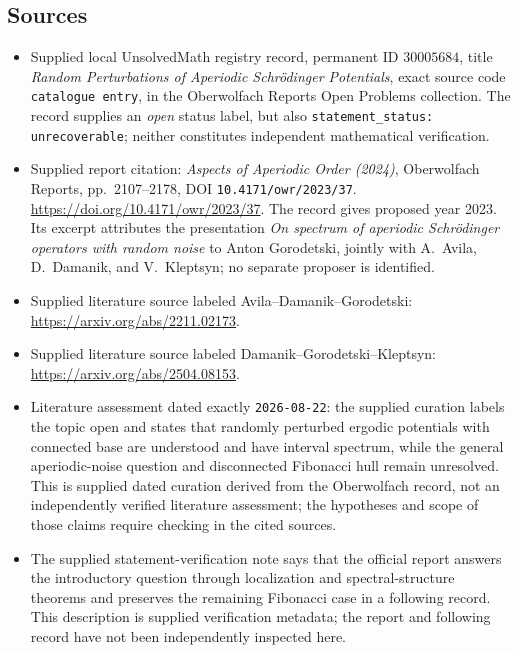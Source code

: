 \documentclass[11pt]{article}
\begin{document}
\subsection{Sources}
\begin{itemize}
\item Supplied local UnsolvedMath registry record, permanent ID \(30005684\), title \emph{Random Perturbations of Aperiodic Schr\"odinger Potentials}, exact source code \texttt{catalogue entry}, in the Oberwolfach Reports Open Problems collection. The record supplies an \emph{open} status label, but also \texttt{statement\_status: unrecoverable}; neither constitutes independent mathematical verification.
\item Supplied report citation: \emph{Aspects of Aperiodic Order (2024)}, Oberwolfach Reports, pp.\ 2107--2178, DOI \texttt{10.4171/owr/2023/37}. \url{https://doi.org/10.4171/owr/2023/37}. The record gives proposed year 2023. Its excerpt attributes the presentation \emph{On spectrum of aperiodic Schr\"odinger operators with random noise} to Anton Gorodetski, jointly with A.\ Avila, D.\ Damanik, and V.\ Kleptsyn; no separate proposer is identified.
\item Supplied literature source labeled Avila--Damanik--Gorodetski: \url{https://arxiv.org/abs/2211.02173}.
\item Supplied literature source labeled Damanik--Gorodetski--Kleptsyn: \url{https://arxiv.org/abs/2504.08153}.
\item Literature assessment dated exactly \texttt{2026-08-22}: the supplied curation labels the topic open and states that randomly perturbed ergodic potentials with connected base are understood and have interval spectrum, while the general aperiodic-noise question and disconnected Fibonacci hull remain unresolved. This is supplied dated curation derived from the Oberwolfach record, not an independently verified literature assessment; the hypotheses and scope of those claims require checking in the cited sources.
\item The supplied statement-verification note says that the official report answers the introductory question through localization and spectral-structure theorems and preserves the remaining Fibonacci case in a following record. This description is supplied verification metadata; the report and following record have not been independently inspected here.
\end{itemize}
\end{document}
